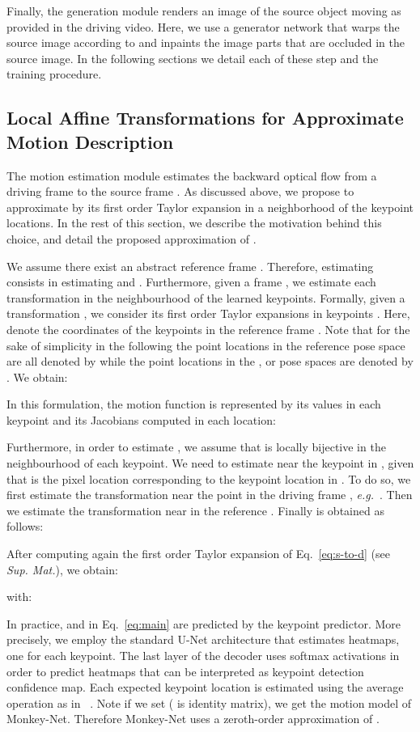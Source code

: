 \documentclass{article}
\def\eg{\textit{e.g.}}
\begin{document}
Finally, the generation module renders an image of the source object moving as provided in the driving video. Here, we use a generator network  that warps the source image according to  and inpaints the image parts that are occluded in the source image. In the following sections we detail each of these step and the training procedure.


\subsection{Local Affine Transformations for Approximate Motion Description}
\label{sec:locAffine}
The motion estimation module estimates the backward optical flow  from a driving frame  to the source frame . As discussed above, we propose to approximate  by its first order Taylor expansion in a neighborhood of the keypoint locations. In the rest of this section, we describe the motivation behind this choice, and detail the proposed approximation of .


We assume there exist an abstract reference frame . Therefore, estimating  consists in estimating   and . Furthermore, given a frame , we estimate each transformation  in the neighbourhood of the learned keypoints. Formally, given a transformation , we consider its first order Taylor expansions in  keypoints . Here,  denote the coordinates of the keypoints in the reference frame . Note that for the sake of simplicity in the following the point locations in the reference pose space are all denoted by  while the point locations in the ,  or  pose spaces are denoted by . We obtain:

In this formulation, the motion function  is represented by its values in each keypoint  and its Jacobians computed in each  location:

Furthermore, in order to estimate , we assume that  is locally bijective in the neighbourhood of each keypoint. We need to estimate  near the keypoint  in , given that  is the pixel location corresponding to the keypoint location  in . To do so, we first estimate the transformation  near the point  in the driving frame , \eg \ . Then we estimate the transformation  near  in the reference . Finally  is obtained as follows:

After computing again the first order Taylor expansion of Eq.~\eqref{eq:s-to-d} (see \textit{Sup. Mat.}), we obtain:

with:


In practice,  and  in Eq.~\eqref{eq:main} are predicted by the keypoint predictor.
More precisely, we employ the standard U-Net architecture that estimates  heatmaps, one for each keypoint. The last layer of the decoder uses softmax activations in
order to predict heatmaps that can be interpreted as keypoint detection confidence map. Each expected keypoint location is estimated using the average operation as in ~\cite{siarohin2018animating,robinson2019laplace}. Note if we set  ( is  identity matrix), we get the motion model of Monkey-Net. Therefore Monkey-Net uses a zeroth-order approximation of .
\end{document}
